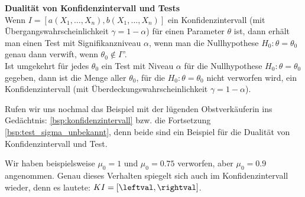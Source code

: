\begin{satz} \textbf{Dualität von Konfidenzintervall und Tests}\\
Wenn $I=[a(X_1,\dots, X_n),b(X_1,\dots, X_n)]$ ein Konfidenzintervall (mit Übergangswahrscheinlichkeit $\gamma=1-\alpha$) für einen Parameter $\theta$ ist, dann erhält man einen Test mit Signifikanzniveau $\alpha$, wenn man die Nullhypothese $H_0:\theta=\theta_0$ genau dann verwift, wenn $\theta_0\not\in I$''.\\

Ist umgekehrt für jedes $\theta_0$ ein Test mit Niveau $\alpha$
für die Nullhypothese $H_0:\theta=\theta_0$ gegeben, dann ist
die Menge aller $\theta_0$, für die $H_0:\theta=\theta_0$ 
nicht verworfen wird, ein Konfidenzintervall (mit 
Überdeckungswahrscheinlichkeit $\gamma=1-\alpha$).
\end{satz}
\begin{bsp}
{
    \def\xquer{0.89}
    \def\snval{0.26}
    \def\nval{51}
    \def\alphaval{5}
    \def\tval{2.01}
    \pgfmathsetmacro{\fractionval}{\snval/sqrt(\nval)}
    \pgfmathsetmacro{\productval}{\tval*\fractionval}
    \pgfmathsetmacro{\leftval}{\xquer-\productval}
    \pgfmathsetmacro{\rightval}{\xquer+\productval}
Rufen wir uns nochmal das Beispiel mit der lügenden Obstverkäuferin ins Gedächtnis:
\ref{bsp:konfidenzintervall} bzw. die Fortsetzung \ref{bsp:test_sigma_unbekannt}, denn beide sind ein Beispiel für die Dualität von Konfidenzintervall und Test.

    Wir haben beispielsweise $\mu_0=1$ und $\mu_0=0.75$ verworfen, aber $\mu_0=0.9$ angenommen. Genau dieses Verhalten spiegelt sich auch im Konfidenzintervall wieder, denn es lautete: $KI=[\leftval,\rightval]$.

}
\end{bsp}
